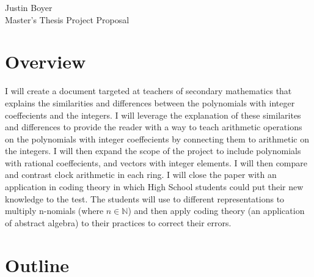 \documentclass[12pt]{article}
\begin{document}
Justin Boyer\\
Master's Thesis Project Proposal

\section{Overview}

I will create a document targeted at teachers of secondary mathematics that explains the similarities and differences between the polynomials with integer coeffecients and the integers.  I will leverage the explanation of these similarites and differences to provide the reader with a way to teach arithmetic operations on the polynomials with integer coeffecients by connecting them to arithmetic on the integers.  I will then expand the scope of the project to include polynomials with rational coeffecients, and vectors with integer elements.  I will then compare and contrast clock arithmetic in each ring.  I will close the paper with an application in coding theory in which High School students could put their new knowledge to the test.  The students will use to different representations to multiply n-nomials (where $n \in \mathbb{N}$) and then apply coding theory (an application of abstract algebra) to their practices to correct their errors.

\section{Outline}
\end{document}
